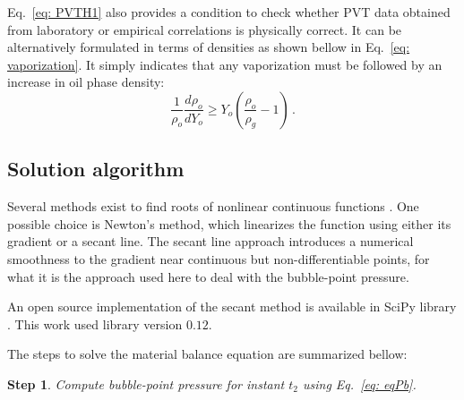 \documentclass[authoryear,preprint,review,11pt]{elsarticle}
\newtheorem{step}{Step}
\begin{document}
Eq.~\eqref{eq: PVTH1} also provides a condition to check whether PVT data obtained from laboratory or empirical correlations is physically correct. It can be alternatively formulated in terms of densities as shown bellow in Eq.~\eqref{eq: vaporization}. It simply indicates that any vaporization must be followed by an increase in oil phase density:
\begin{equation}\label{eq: vaporization}
\frac{1}{\rho_o}\frac{d\rho_o}{dY_o} \geq Y_o \left( \frac{\rho_o}{\rho_g} - 1 \right) \, .
\end{equation}



\subsection{Solution algorithm}
Several methods exist to find roots of nonlinear continuous functions \citep{hamming1987numerical}. One possible choice is Newton's method, which linearizes the function using either its gradient or a secant line. The secant line approach introduces a numerical smoothness to the gradient near continuous but non-differentiable points, for what it is the approach used here to deal with the bubble-point pressure.

An open source implementation of the secant method is available in SciPy library \citep{scipy}. This work used library version $0.12$.




The steps to solve the material balance equation are summarized bellow:
\begin{step}
Compute bubble-point pressure for instant $t_2$ using Eq.~\eqref{eq: eqPb}.
\end{step}
\end{document}
